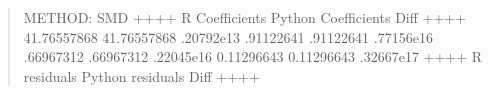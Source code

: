 \documentclass[letterpaper,10pt,english]{sphinxmanual}
\begin{document}
\begin{enumerate}
\begin{quote}
\begin{sphinxVerbatim}[commandchars=\\\{\}]
METHOD: SMD
+\PYGZhy{}\PYGZhy{}\PYGZhy{}\PYGZhy{}\PYGZhy{}\PYGZhy{}\PYGZhy{}\PYGZhy{}\PYGZhy{}\PYGZhy{}\PYGZhy{}\PYGZhy{}\PYGZhy{}\PYGZhy{}\PYGZhy{}\PYGZhy{}+\PYGZhy{}\PYGZhy{}\PYGZhy{}\PYGZhy{}\PYGZhy{}\PYGZhy{}\PYGZhy{}\PYGZhy{}\PYGZhy{}\PYGZhy{}\PYGZhy{}\PYGZhy{}\PYGZhy{}\PYGZhy{}\PYGZhy{}\PYGZhy{}\PYGZhy{}\PYGZhy{}\PYGZhy{}\PYGZhy{}\PYGZhy{}+\PYGZhy{}\PYGZhy{}\PYGZhy{}\PYGZhy{}\PYGZhy{}\PYGZhy{}\PYGZhy{}\PYGZhy{}\PYGZhy{}\PYGZhy{}\PYGZhy{}\PYGZhy{}\PYGZhy{}+
 R Coefficients  Python Coefficients     Diff     
+\PYGZhy{}\PYGZhy{}\PYGZhy{}\PYGZhy{}\PYGZhy{}\PYGZhy{}\PYGZhy{}\PYGZhy{}\PYGZhy{}\PYGZhy{}\PYGZhy{}\PYGZhy{}\PYGZhy{}\PYGZhy{}\PYGZhy{}\PYGZhy{}+\PYGZhy{}\PYGZhy{}\PYGZhy{}\PYGZhy{}\PYGZhy{}\PYGZhy{}\PYGZhy{}\PYGZhy{}\PYGZhy{}\PYGZhy{}\PYGZhy{}\PYGZhy{}\PYGZhy{}\PYGZhy{}\PYGZhy{}\PYGZhy{}\PYGZhy{}\PYGZhy{}\PYGZhy{}\PYGZhy{}\PYGZhy{}+\PYGZhy{}\PYGZhy{}\PYGZhy{}\PYGZhy{}\PYGZhy{}\PYGZhy{}\PYGZhy{}\PYGZhy{}\PYGZhy{}\PYGZhy{}\PYGZhy{}\PYGZhy{}\PYGZhy{}+
   \PYGZhy{}41.76557868         \PYGZhy{}41.76557868  .20792e\PYGZhy{}13 
     .91122641           .91122641  .77156e\PYGZhy{}16 
     .66967312           .66967312  .22045e\PYGZhy{}16 
    \PYGZhy{}0.11296643          \PYGZhy{}0.11296643  .32667e\PYGZhy{}17 
+\PYGZhy{}\PYGZhy{}\PYGZhy{}\PYGZhy{}\PYGZhy{}\PYGZhy{}\PYGZhy{}\PYGZhy{}\PYGZhy{}\PYGZhy{}\PYGZhy{}\PYGZhy{}\PYGZhy{}\PYGZhy{}\PYGZhy{}\PYGZhy{}+\PYGZhy{}\PYGZhy{}\PYGZhy{}\PYGZhy{}\PYGZhy{}\PYGZhy{}\PYGZhy{}\PYGZhy{}\PYGZhy{}\PYGZhy{}\PYGZhy{}\PYGZhy{}\PYGZhy{}\PYGZhy{}\PYGZhy{}\PYGZhy{}\PYGZhy{}\PYGZhy{}\PYGZhy{}\PYGZhy{}\PYGZhy{}+\PYGZhy{}\PYGZhy{}\PYGZhy{}\PYGZhy{}\PYGZhy{}\PYGZhy{}\PYGZhy{}\PYGZhy{}\PYGZhy{}\PYGZhy{}\PYGZhy{}\PYGZhy{}\PYGZhy{}+
  R residuals     Python residuals       Diff     
+\PYGZhy{}\PYGZhy{}\PYGZhy{}\PYGZhy{}\PYGZhy{}\PYGZhy{}\PYGZhy{}\PYGZhy{}\PYGZhy{}\PYGZhy{}\PYGZhy{}\PYGZhy{}\PYGZhy{}\PYGZhy{}\PYGZhy{}\PYGZhy{}+\PYGZhy{}\PYGZhy{}\PYGZhy{}\PYGZhy{}\PYGZhy{}\PYGZhy{}\PYGZhy{}\PYGZhy{}\PYGZhy{}\PYGZhy{}\PYGZhy{}\PYGZhy{}\PYGZhy{}\PYGZhy{}\PYGZhy{}\PYGZhy{}\PYGZhy{}\PYGZhy{}\PYGZhy{}\PYGZhy{}\PYGZhy{}+\PYGZhy{}\PYGZhy{}\PYGZhy{}\PYGZhy{}\PYGZhy{}\PYGZhy{}\PYGZhy{}\PYGZhy{}\PYGZhy{}\PYGZhy{}\PYGZhy{}\PYGZhy{}\PYGZhy{}+

\end{sphinxVerbatim}
\end{quote}
\end{enumerate}
\end{document}
